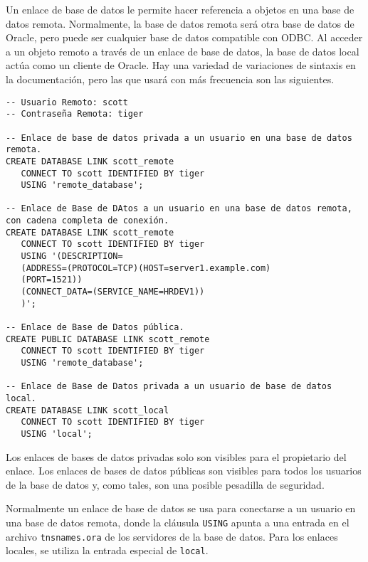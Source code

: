 \documentclass[../main.tex]{subfiles}
\begin{document}
\begin{enumerate}
        Un enlace de base de datos le permite hacer referencia a objetos en una base de datos remota.
        Normalmente, la base de datos remota será otra base de datos de Oracle, pero puede ser cualquier
        base de datos compatible con ODBC.\@
        Al acceder a un objeto remoto a través de un enlace de base de datos, la base de datos local
        actúa como un cliente de Oracle. Hay una variedad de variaciones de sintaxis en la documentación,
        pero las que usará con más frecuencia son las siguientes.
        \begin{code}
          \begin{verbatim}
-- Usuario Remoto: scott
-- Contraseña Remota: tiger

-- Enlace de base de datos privada a un usuario en una base de datos remota.
CREATE DATABASE LINK scott_remote
   CONNECT TO scott IDENTIFIED BY tiger
   USING 'remote_database';

-- Enlace de Base de DAtos a un usuario en una base de datos remota, con cadena completa de conexión.
CREATE DATABASE LINK scott_remote
   CONNECT TO scott IDENTIFIED BY tiger
   USING '(DESCRIPTION=
   (ADDRESS=(PROTOCOL=TCP)(HOST=server1.example.com)
   (PORT=1521))
   (CONNECT_DATA=(SERVICE_NAME=HRDEV1))
   )';

-- Enlace de Base de Datos pública.
CREATE PUBLIC DATABASE LINK scott_remote
   CONNECT TO scott IDENTIFIED BY tiger
   USING 'remote_database';

-- Enlace de Base de Datos privada a un usuario de base de datos local.
CREATE DATABASE LINK scott_local
   CONNECT TO scott IDENTIFIED BY tiger
   USING 'local';
          \end{verbatim}
        \end{code}

        Los enlaces de bases de datos privadas solo son visibles para el propietario
        del enlace. Los enlaces de bases de datos públicas son visibles para todos los
        usuarios de la base de datos y, como tales, son una posible pesadilla de
        seguridad.

        Normalmente un enlace de base de datos se usa para conectarse
        a un usuario en una base de datos remota, donde la cláusula \texttt{USING} apunta a una
        entrada en el archivo \texttt{tnsnames.ora} de los servidores de la base de datos. Para
        los enlaces locales, se utiliza la entrada especial de \texttt{local}.

\end{enumerate}
\end{document}
